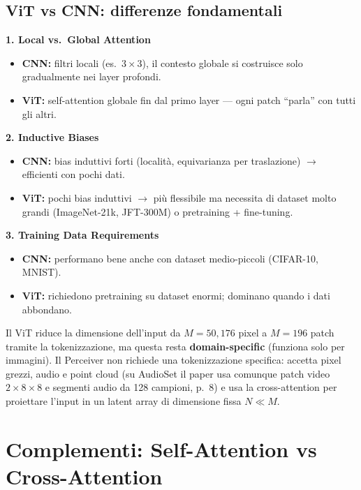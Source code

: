 \documentclass[
  11pt,
]{article}
\begin{document}
\subsection{ViT vs CNN: differenze fondamentali}

\textbf{1. Local vs.\ Global Attention}
\begin{itemize}
\item \textbf{CNN:} filtri locali (es.\ $3 \times 3$), il contesto globale si costruisce solo gradualmente nei layer profondi.
\item \textbf{ViT:} self-attention globale fin dal primo layer --- ogni patch ``parla'' con tutti gli altri.
\end{itemize}

\textbf{2. Inductive Biases}
\begin{itemize}
\item \textbf{CNN:} bias induttivi forti (localit\`a, equivarianza per traslazione) $\to$ efficienti con pochi dati.
\item \textbf{ViT:} pochi bias induttivi $\to$ pi\`u flessibile ma necessita di dataset molto grandi (ImageNet-21k, JFT-300M) o pretraining + fine-tuning.
\end{itemize}

\textbf{3. Training Data Requirements}
\begin{itemize}
\item \textbf{CNN:} performano bene anche con dataset medio-piccoli (CIFAR-10, MNIST).
\item \textbf{ViT:} richiedono pretraining su dataset enormi; dominano quando i dati abbondano.
\end{itemize}

\begin{notabox}[title={\textbf{Collegamento al Perceiver}}]
Il ViT riduce la dimensione dell'input da $M = 50{,}176$ pixel a $M = 196$ patch tramite la tokenizzazione, ma questa resta \textbf{domain-specific} (funziona solo per immagini). Il Perceiver non richiede una tokenizzazione specifica: accetta pixel grezzi, audio e point cloud (su AudioSet il paper usa comunque patch video $2\times8\times8$ e segmenti audio da 128 campioni, p.~8) e usa la cross-attention per proiettare l'input in un latent array di dimensione fissa $N \ll M$.
\end{notabox}

\section{Complementi: Self-Attention vs Cross-Attention}
\label{app:self-vs-cross}
\end{document}
